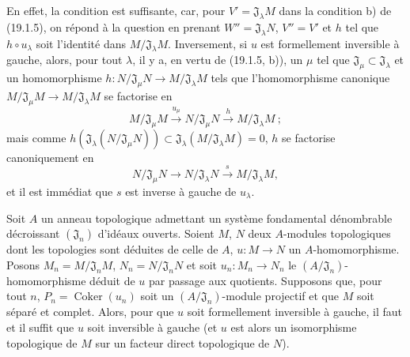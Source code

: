 En effet, la condition est suffisante, car, pour
$V'=\mathfrak J_\lambda M$ dans la condition b) de (19.1.5), on répond à la
question en prenant $W''=\mathfrak J_\lambda N$, $V''=V'$ et $h$ tel que
$h\circ u_\lambda$ soit l'identité dans $M/\mathfrak J_\lambda M$.
Inversement, si $u$ est formellement inversible à gauche, alors, pour tout
$\lambda$, il y a, en vertu de (19.1.5, b)), un $\mu$ tel que
$\mathfrak J_\mu\subset\mathfrak J_\lambda$ et un homomorphisme
$h:N/\mathfrak J_\mu N\to M/\mathfrak J_\lambda M$ tels que l'homomorphisme
canonique $M/\mathfrak J_\mu M\to M/\mathfrak J_\lambda M$ se factorise en
\[
  M/\mathfrak J_\mu M\xrightarrow{u_\mu}N/\mathfrak J_\mu N
  \xrightarrow{h}M/\mathfrak J_\lambda M~;
\]
mais comme
$h(\mathfrak J_\lambda(N/\mathfrak J_\mu N))
\subset\mathfrak J_\lambda(M/\mathfrak J_\lambda M)=0$, $h$ se factorise
canoniquement en
\[
  N/\mathfrak J_\mu N\longrightarrow N/\mathfrak J_\lambda N
  \xrightarrow{s}M/\mathfrak J_\lambda M,
\]
et il est immédiat que $s$ est inverse à gauche de $u_\lambda$.

\begin{proposition}[19.1.8]
\label{0.19.1.8-fr}
Soit $A$ un anneau topologique admettant un système fondamental dénombrable
décroissant $(\mathfrak J_n)$ d'idéaux ouverts. Soient $M$, $N$ deux
$A$-modules topologiques dont les topologies sont déduites de celle de $A$,
$u:M\to N$ un $A$-homomorphisme. Posons
$M_n=M/\mathfrak J_nM$, $N_n=N/\mathfrak J_nN$ et soit
$u_n:M_n\to N_n$ le $(A/\mathfrak J_n)$-homomorphisme déduit de $u$ par
passage aux quotients. Supposons que, pour tout $n$,
$P_n=\operatorname{Coker}(u_n)$ soit un $(A/\mathfrak J_n)$-module projectif
et que $M$ soit séparé et complet. Alors, pour que $u$ soit formellement
inversible à gauche, il faut et il suffit que $u$ soit inversible à gauche (et
$u$ est alors un isomorphisme topologique de $M$ sur un facteur direct
topologique de $N$).
\end{proposition}


